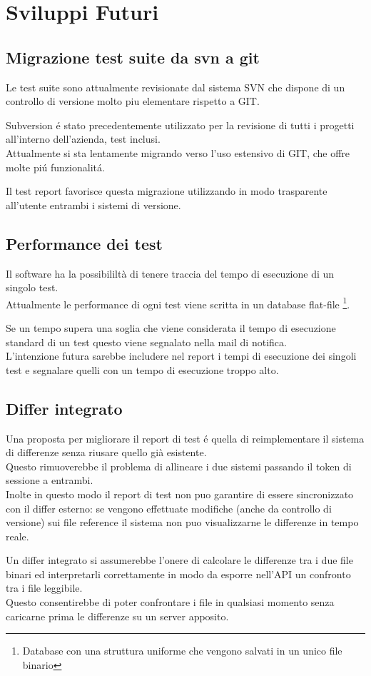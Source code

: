 \chapter{Sviluppi Futuri}
    \section{Migrazione test suite da svn a git}
        Le test suite sono attualmente revisionate dal sistema SVN che dispone di un controllo di versione molto piu elementare rispetto a GIT.

        Subversion \'e stato precedentemente utilizzato per la revisione di tutti i progetti all'interno dell'azienda, test inclusi.\\
        Attualmente si sta lentamente migrando verso l'uso estensivo di GIT, che offre molte pi\'u funzionalit\'a.

        Il test report favorisce questa migrazione utilizzando in modo trasparente all'utente entrambi i sistemi di versione. 
    \section{Performance dei test}
        Il software ha la possibililtà di tenere traccia del tempo di esecuzione di un singolo test.\\
        Attualmente le performance di ogni test viene scritta in un database flat-file \footnote{Database con una struttura uniforme che vengono salvati in un unico file binario}.

        Se un tempo supera una soglia che viene considerata il tempo di esecuzione standard di un test questo viene segnalato nella mail di notifica.\\
        L'intenzione futura sarebbe includere nel report i tempi di esecuzione dei singoli test e segnalare quelli con un tempo di esecuzione troppo alto.
    \section{Differ integrato}
        Una proposta per migliorare il report di test \'e quella di reimplementare il sistema di differenze senza riusare quello già esistente.\\
        Questo rimuoverebbe il problema di allineare i due sistemi passando il token di sessione a entrambi.\\
        Inolte in questo modo il report di test non puo garantire di essere sincronizzato con il differ esterno: se vengono effettuate modifiche (anche da controllo di versione) sui file reference il sistema non puo visualizzarne le differenze in tempo reale.
        
        Un differ integrato si assumerebbe l'onere di calcolare le differenze tra i due file binari ed interpretarli correttamente in modo da esporre nell'API un confronto tra i file leggibile.\\
        Questo consentirebbe di poter confrontare i file in qualsiasi momento senza caricarne prima le differenze su un server apposito.